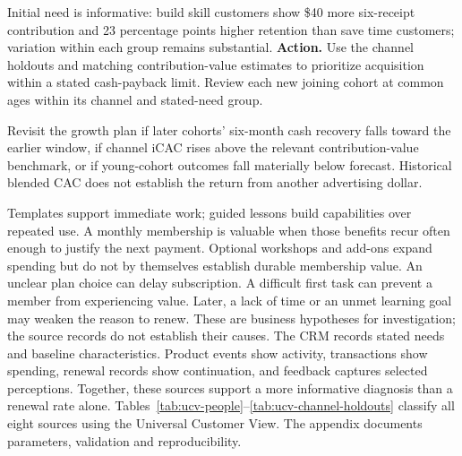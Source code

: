 \documentclass[10pt]{article}
\begin{document}
Initial need is informative: build skill customers show \$40 more six-receipt contribution and 23 percentage points higher retention than save time customers; variation within each group remains substantial.
\textbf{Action.} Use the channel holdouts and matching contribution-value estimates to prioritize acquisition within a stated cash-payback limit. Review each new joining cohort at common ages within its channel and stated-need group.

Revisit the growth plan if later cohorts' six-month cash recovery falls toward the earlier window, if channel iCAC rises above the relevant contribution-value benchmark, or if young-cohort outcomes fall materially below forecast. Historical blended CAC does not establish the return from another advertising dollar.


Templates support immediate work; guided lessons build capabilities over repeated use. A monthly membership is valuable when those benefits recur often enough to justify the next payment. Optional workshops and add-ons expand spending but do not by themselves establish durable membership value.
An unclear plan choice can delay subscription. A difficult first task can prevent a member from experiencing value. Later, a lack of time or an unmet learning goal may weaken the reason to renew. These are business hypotheses for investigation; the source records do not establish their causes.
The CRM records stated needs and baseline characteristics. Product events show activity, transactions show spending, renewal records show continuation, and feedback captures selected perceptions. Together, these sources support a more informative diagnosis than a renewal rate alone. Tables~\ref{tab:ucv-people}--\ref{tab:ucv-channel-holdouts} classify all eight sources using the Universal Customer View. The appendix documents parameters, validation and reproducibility.
\end{document}
